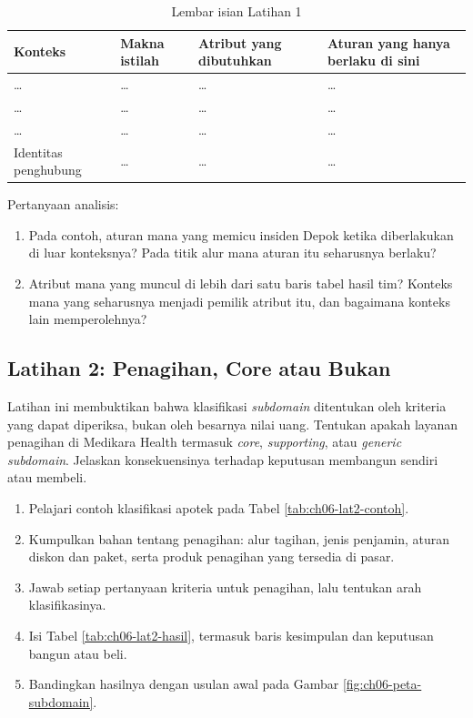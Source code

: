 \begin{table}[!htb]
  \centering
  \caption{Lembar isian Latihan 1}
  \label{tab:ch06-lat1-hasil}
  \footnotesize
  \begin{tabularx}{\textwidth}{>{\raggedright\arraybackslash}p{2.0cm} >{\raggedright\arraybackslash}X >{\raggedright\arraybackslash}X >{\raggedright\arraybackslash}X}
    \hline
    \textbf{Konteks} & \textbf{Makna istilah} & \textbf{Atribut yang dibutuhkan} & \textbf{Aturan
      yang hanya berlaku di sini} \\ \hline
    \dots & \dots & \dots & \dots \\ \hline
    \dots & \dots & \dots & \dots \\ \hline
    \dots & \dots & \dots & \dots \\ \hline
    Identitas penghubung & \dots & \dots & \dots \\ \hline
  \end{tabularx}
\end{table}

Pertanyaan analisis:
\begin{enumerate}
  \item Pada contoh, aturan mana yang memicu insiden Depok ketika diberlakukan di luar konteksnya?
        Pada titik alur mana aturan itu seharusnya berlaku?
  \item Atribut mana yang muncul di lebih dari satu baris tabel hasil tim? Konteks mana yang
        seharusnya menjadi pemilik atribut itu, dan bagaimana konteks lain memperolehnya?
\end{enumerate}

\subsection*{Latihan 2: Penagihan, Core atau Bukan}

Latihan ini membuktikan bahwa klasifikasi \textit{subdomain} ditentukan oleh kriteria yang dapat
diperiksa, bukan oleh besarnya nilai uang. Tentukan apakah layanan penagihan di Medikara Health
termasuk \textit{core}, \textit{supporting}, atau \textit{generic subdomain}. Jelaskan
konsekuensinya terhadap keputusan membangun sendiri atau membeli.

\begin{enumerate}
  \item Pelajari contoh klasifikasi apotek pada Tabel \ref{tab:ch06-lat2-contoh}.
  \item Kumpulkan bahan tentang penagihan: alur tagihan, jenis penjamin, aturan diskon dan paket,
        serta produk penagihan yang tersedia di pasar.
  \item Jawab setiap pertanyaan kriteria untuk penagihan, lalu tentukan arah klasifikasinya.
  \item Isi Tabel \ref{tab:ch06-lat2-hasil}, termasuk baris kesimpulan dan keputusan bangun atau
        beli.
  \item Bandingkan hasilnya dengan usulan awal pada Gambar \ref{fig:ch06-peta-subdomain}.
\end{enumerate}

